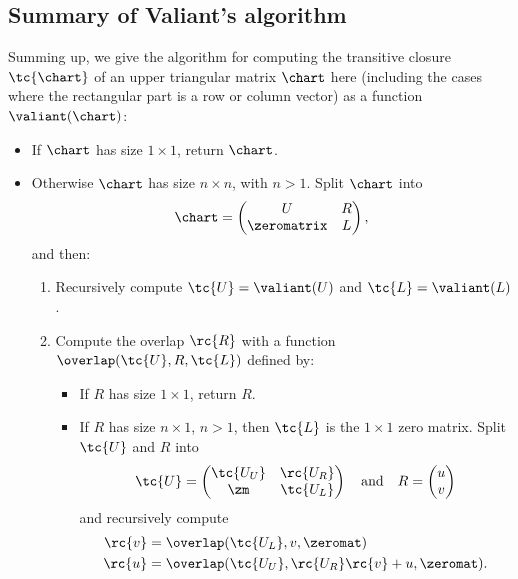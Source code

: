 \subsection{Summary of Valiant's algorithm}
\label{Valiant-summing-up}
Summing up, we give the algorithm for computing the transitive closure $\tc{\chart}$ of an upper triangular matrix $\chart$ here (including the cases where the rectangular part is a row or column vector) as a function $\valiant(\chart)$:
\begin{itemize}
\item If $\chart$ has size $1 \times 1$, return $\chart$.
\item Otherwise $\chart$ has size $n \times n$, with $n > 1$. Split $\chart$ into
  \begin{equation*}
    \chart = 
    \begin{pmatrix}
      U           &  R \\
      \zeromatrix &  L
    \end{pmatrix},
  \end{equation*}
  and then: 
  \begin{enumerate}
  \item Recursively compute $\tc{U} = \valiant(U)$ and $\tc{L} = \valiant(L)$.
  \item Compute the overlap $\rc{R}$ with a function $\overlap(\tc{U}, R, \tc{L})$ defined by:
    \begin{itemize}
    \item If $R$ has size $1 \times 1$, return $R$.
    \item If $R$ has size $n \times 1$, $n > 1$, then $\tc{L}$ is the $1\times 1$ zero matrix. Split $\tc{U}$ and $R$ into
      \begin{equation*}
        \tc{U} = 
        \begin{pmatrix}
          \tc{U_U} & \rc{U_R} \\
          \zm      & \tc{U_L} 
        \end{pmatrix} 
        \quad \text{and}\quad
        R = 
        \begin{pmatrix}
          u \\
          v
        \end{pmatrix}
      \end{equation*}
        and recursively compute 
        \begin{align*}
          \rc{v} &= \overlap(\tc{U_L}, v, \zeromat)\\
          \rc{u} &= \overlap(\tc{U_U}, \rc{U_R}\rc{v} + u, \zeromat).
        \end{align*}

\end{itemize}
\end{enumerate}
\end{itemize}
